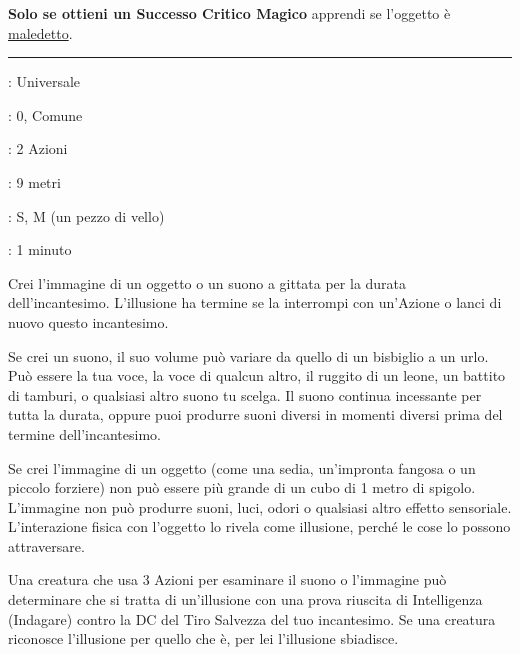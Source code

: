 \begin{multicols}{2}
\textbf{Solo se ottieni un Successo Critico Magico} apprendi se l'oggetto è \hyperlink{oggettimaledettiid}{maledetto}.

\smallskip\noindent\rule{\linewidth}{2pt} \hypertarget{Illusione Minore}{}\smallskip{}
\noindent
\begin{description}[noitemsep, topsep=0pt, parsep=0pt, partopsep=0pt, leftmargin=0cm, labelwidth=2.8cm]
	\item[\textbf{Lista di Magia}]: Universale
	\item[\textbf{Livello}]: 0, Comune
	\item[\textbf{T. di Lancio}]: 2 Azioni
	\item[\textbf{Gittata}]: 9 metri
	\item[\textbf{Componenti}]: S, M (un pezzo di vello)
	\item[\textbf{Durata}]: 1 minuto
\end{description}

Crei l'immagine di un oggetto o un suono a gittata per la durata dell'incantesimo. L'illusione ha termine se la interrompi con un'Azione o lanci di nuovo questo incantesimo.

Se crei un suono, il suo volume può variare da quello di un bisbiglio a un urlo. Può essere la tua voce, la voce di qualcun altro, il ruggito di un leone, un battito di tamburi, o qualsiasi altro suono tu scelga. Il suono continua incessante per tutta la durata, oppure puoi produrre suoni diversi in momenti diversi prima del termine dell'incantesimo.

Se crei l'immagine di un oggetto (come una sedia, un'impronta fangosa o un piccolo forziere) non può essere più grande di un cubo di 1 metro di spigolo. L'immagine non può produrre suoni, luci, odori o qualsiasi altro effetto sensoriale. L'interazione fisica con l'oggetto lo rivela come illusione, perché le cose lo possono attraversare.

Una creatura che usa 3 Azioni per esaminare il suono o l'immagine può determinare che si tratta di un'illusione con una prova riuscita di Intelligenza (Indagare) contro la DC del Tiro Salvezza del tuo incantesimo. Se una creatura riconosce l'illusione per quello che è, per lei l'illusione sbiadisce.


\end{multicols}
